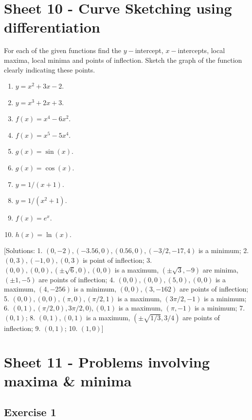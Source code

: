 \documentclass[
  11pt,
  oneside]{book}
\providecommand{\tightlist}{%
  \setlength{\itemsep}{0pt}\setlength{\parskip}{0pt}}
\newcommand{\slide}{}
\theoremstyle{definition}
\theoremstyle{definition}
\theoremstyle{definition}
\theoremstyle{definition}
\theoremstyle{remark}
\begin{document}
\section{Sheet 10 - Curve Sketching using differentiation}\label{sheet-10---curve-sketching-using-differentiation}

For each of the given functions find the \(y-\)intercept, \(x-\)intercepts, local maxima, local minima
and points of inflection. Sketch the graph of the function clearly indicating these points.

\begin{enumerate}
\def\labelenumi{\arabic{enumi}.}
\tightlist
\item
  \(y=x^2+3x-2\).
\item
  \(y=x^3+2x+3\).
\item
  \(f(x)=x^4-6x^2\).
\item
  \(f(x)=x^5-5x^4\).
\item
  \(g(x)=\sin(x)\).
\item
  \(g(x)=\cos(x)\).
\item
  \(y=1/(x+1)\).
\item
  \(y=1/(x^2+1)\).
\item
  \(f(x)=e^x\).
\item
  \(h(x)=\ln(x)\).
\end{enumerate}

{[}Solutions: 1. \((0,-2), (-3.56,0), (0.56,0), (-3/2,-17,4)\) is a minimum; 2. \((0,3), (-1,0), (0,3)\) is point of inflection; 3. \((0,0), (0,0), (\pm\sqrt{6},0), (0,0)\) is a maximum, \((\pm\sqrt{3},-9)\) are minima, \((\pm 1,-5)\) are points of inflection; 4. \((0,0), (0,0), (5,0), (0,0)\) is a maximum, \((4,-256)\) is a minimum, \((0,0), (3,-162)\) are points of inflection; 5. \((0,0), (0,0), (\pi,0), (\pi/2,1)\) is a maximum, \((3\pi/2,-1)\) is a minimum; 6. \((0,1), (\pi/2,0), 3\pi/2,0), (0,1)\) is a maximum, \((\pi,-1)\) is a minimum; 7. \((0,1)\); 8. \((0,1), (0,1)\) is a maximum, \((\pm\sqrt{1/3},3/4)\) are points of inflection; 9. \((0,1)\); 10. \((1,0)\){]}
\slide

\section{Sheet 11 - Problems involving maxima \& minima}\label{sheet-11---problems-involving-maxima-minima}

\subsection*{Exercise 1}\label{exercise-1-4}
\end{document}

